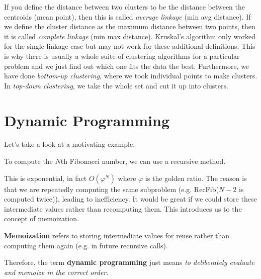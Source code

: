 \documentclass{article}
\begin{document}
      If you define the distance between two clusters to be the distance between the centroids (mean point), then this is called \textit{average linkage} (min avg distance). If we define the cluster distance as the maximum distance between two points, then it is called \textit{complete linkage} (min max distance). Kruskal's algorithm only worked for the single linkage case but may not work for these additional definitions. This is why there is usually a whole suite of clustering algorithms for a particular problem and we just find out which one fits the data the best. Furthermore, we have done \textit{bottom-up clustering}, where we took individual points to make clusters. In \textit{top-down clustering}, we take the whole set and cut it up into clusters.  

\section{Dynamic Programming}
  
    Let's take a look at a motivating example. 

    \begin{example}
      To compute the $N$th Fibonacci number, we can use a recursive method. 
      \begin{algorithm}[H]
        \caption{}
        \label{alg:recfib}
        \begin{algorithmic}
          \State 
              \State {}
              \State {}
            \Else 
              \State {}
            \EndIf
          \EndFunction
        \end{algorithmic}
      \end{algorithm}
    \end{example}

    This is exponential, in fact $O(\varphi^N)$ where $\varphi$ is the golden ratio. The reason is that we are repeatedly computing the same subproblem (e.g. RecFib($N-2$ is computed twice)), leading to inefficiency. It would be great if we could store these intermediate values rather than recomputing them. This introduces us to the concept of memoization. 

    \begin{definition}[Memoization]
      \textbf{Memoization} refers to storing intermediate values for reuse rather than computing them again (e.g. in future recursive calls). 
      
      Therefore, the term \textbf{dynamic programming} just means \textit{to deliberately evaluate and memoize in the correct order}. 
    \end{definition}
\end{document}
